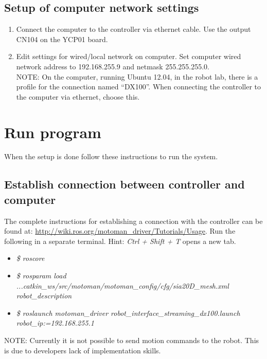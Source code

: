 \documentclass[10pt,a4paper]{article}
\begin{document}
\subsection{Setup of computer network settings}
\label{setup}
\begin{enumerate}

\item Connect the computer to the controller via ethernet cable. Use the output CN104 on the YCP01 board.
\item Edit settings for wired/local network on computer. Set computer wired network address to 192.168.255.9 and netmask 255.255.255.0.\\


NOTE: On the computer, running Ubuntu 12.04, in the robot lab, there is a profile for the connection named “DX100”. When connecting the controller to the computer via ethernet, choose this.
\end{enumerate}

\section{Run program}
When the setup is done follow these instructions to run the system.
\subsection{Establish connection between controller and computer}
The complete instructions for establishing a connection with the controller can be found at: \url{http://wiki.ros.org/motoman\_driver/Tutorials/Usage}. Run the following in a separate terminal. Hint: \textit{Ctrl + Shift + T} opens a new tab.
\begin{itemize}
\item \textit{\$ roscore}
\item \textit{\$ rosparam load ...catkin\_ws/src/motoman/motoman\_config/cfg/sia20D\_mesh.xml robot\_description}

\item \textit{\$ roslaunch motoman\_driver robot\_interface\_streaming\_dx100.launch robot\_ip:=192.168.255.1}

\end{itemize}
NOTE: Currently it is not possible to send motion commands to the robot.
This is due to developers lack of implementation skills.
\end{document}
